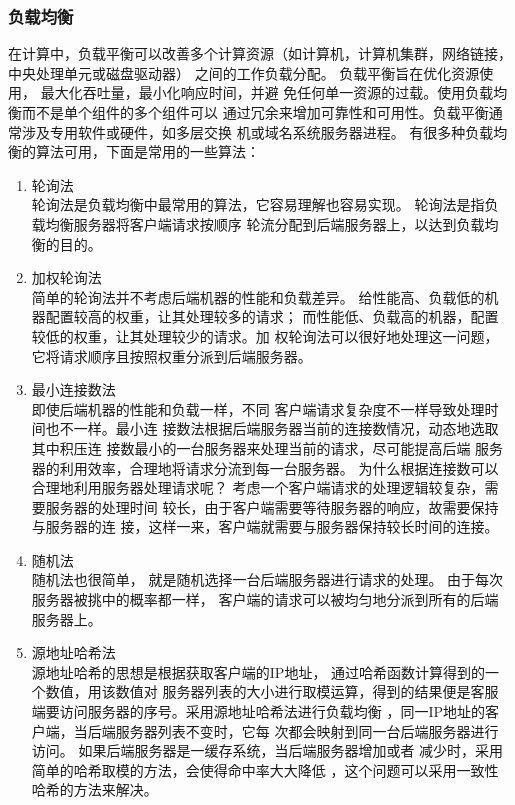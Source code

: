 \subsubsection{负载均衡}
在计算中，负载平衡可以改善多个计算资源（如计算机，计算机集群，网络链接，中央处理单元或磁盘驱动器）
之间的工作负载分配。
负载平衡旨在优化资源使用，
最大化吞吐量，最小化响应时间，并避
免任何单一资源的过载。使用负载均衡而不是单个组件的多个组件可以
通过冗余来增加可靠性和可用性。负载平衡通常涉及专用软件或硬件，如多层交换
机或域名系统服务器进程。
有很多种负载均衡的算法可用，下面是常用的一些算法：
\begin{enumerate}
	\item 轮询法\\
	轮询法是负载均衡中最常用的算法，它容易理解也容易实现。 
	轮询法是指负载均衡服务器将客户端请求按顺序
	轮流分配到后端服务器上，以达到负载均衡的目的。 	
\item 	加权轮询法\\
	简单的轮询法并不考虑后端机器的性能和负载差异。
	给性能高、负载低的机器配置较高的权重，让其处理较多的请求；
	而性能低、负载高的机器，配置较低的权重，让其处理较少的请求。加
	权轮询法可以很好地处理这一问题，它将请求顺序且按照权重分派到后端服务器。 
\item 	最小连接数法\\
	即使后端机器的性能和负载一样，不同
	客户端请求复杂度不一样导致处理时间也不一样。最小连
	接数法根据后端服务器当前的连接数情况，动态地选取其中积压连
	接数最小的一台服务器来处理当前的请求，尽可能提高后端
	服务器的利用效率，合理地将请求分流到每一台服务器。 
	为什么根据连接数可以合理地利用服务器处理请求呢？ 
	考虑一个客户端请求的处理逻辑较复杂，需要服务器的处理时间
	较长，由于客户端需要等待服务器的响应，故需要保持与服务器的连
	接，这样一来，客户端就需要与服务器保持较长时间的连接。 
\item 	随机法\\
	随机法也很简单，
	就是随机选择一台后端服务器进行请求的处理。
	由于每次服务器被挑中的概率都一样，
	客户端的请求可以被均匀地分派到所有的后端服务器上。
\item 	源地址哈希法\\
	源地址哈希的思想是根据获取客户端的IP地址，
	通过哈希函数计算得到的一个数值，用该数值对
	服务器列表的大小进行取模运算，得到的结果便是客服
	端要访问服务器的序号。采用源地址哈希法进行负载均衡
	，同一IP地址的客户端，当后端服务器列表不变时，它每
	次都会映射到同一台后端服务器进行访问。 
	如果后端服务器是一缓存系统，当后端服务器增加或者
	减少时，采用简单的哈希取模的方法，会使得命中率大大降低
	，这个问题可以采用一致性哈希的方法来解决。 
\end{enumerate}
